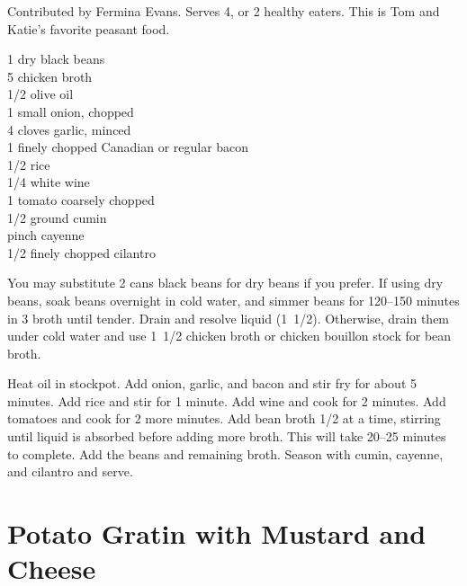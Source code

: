 \begin{open}
  Contributed by Fermina Evans. Serves 4, or 2 healthy eaters. This is Tom and
  Katie's favorite peasant food.
\end{open}
\begin{ingredients}
  \SI{1}{\cup} dry black beans\\
  \SI{5}{\cup} chicken broth\\
  \SI{1/2}{\tblspoon} olive oil \\
  1 small onion, chopped \\
  4 cloves garlic, minced \\
  \SI{1}{\ounce} finely chopped Canadian or regular bacon \\
  \SI{1/2}{\cup} rice \\
  \SI{1/4}{\cup} white wine \\
  1 tomato coarsely chopped \\
  \SI{1/2}{\teaspoon} ground cumin \\
  pinch cayenne \\
  \SI{1/2}{\cup} finely chopped cilantro
\end{ingredients}
You may substitute 2 cans black beans for dry beans if you prefer. If using
dry beans, soak beans overnight in cold water, and simmer beans for
\numrange{120}{150} minutes in \SI{3}{\cup} broth until tender. Drain and
resolve liquid (\SI{1/2}[1]{\cup}). Otherwise, drain them under cold water and
use \SI{1/2}[1]{\cup} chicken broth or chicken bouillon stock for bean broth.

Heat oil in stockpot. Add onion, garlic, and bacon and stir fry for about 5
minutes.  Add rice and stir for 1 minute. Add wine and cook for 2 minutes. Add
tomatoes and cook for 2 more minutes.  Add bean broth \SI{1/2}{\cup} at a
time, stirring until liquid is absorbed before adding more broth. This will
take \numrange{20}{25} minutes to complete. Add the beans and remaining
broth. Season with cumin, cayenne, and cilantro and serve.

\section{Potato Gratin with Mustard and Cheese}

